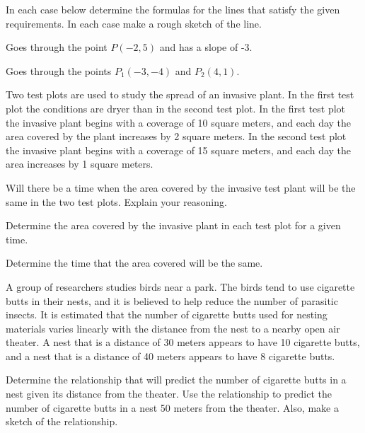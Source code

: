 \begin{problem}
\item In each case below determine the formulas for the lines that
  satisfy the given requirements. In each case make a rough sketch of
  the line.

  \begin{subproblem}
  \item Goes through the point $P(-2,5)$ and has a slope of -3.
    \vfill
  \item Goes through the points $P_1(-3,-4)$ and $P_2(4,1)$.
    \vfill
  \end{subproblem}

  \clearpage

\item Two test plots are used to study the spread of an invasive
  plant. In the first test plot the conditions are dryer than in the
  second test plot. In the first test plot the invasive plant begins
  with a coverage of 10 square meters, and each day the area covered
  by the plant increases by 2 square meters. In the second test plot
  the invasive plant begins with a coverage of 15 square meters, and
  each day the area increases by 1 square meters.

  \begin{subproblem}
  \item Will there be a time when the area covered by the invasive
    test plant will be the same in the two test plots. Explain your
    reasoning.  
    \vfill

  \item Determine the area covered by the invasive plant in each test
    plot for a given time.
    \vfill

  \item Determine the time that the area covered will be the same.
    \vfill
  \end{subproblem}

  \clearpage

\item A group of researchers studies birds near a park. The birds tend
  to use cigarette butts in their nests, and it is believed to help
  reduce the number of parasitic insects. It is estimated that the
  number of cigarette butts used for nesting materials varies linearly
  with the distance from the nest to a nearby open air theater. A nest
  that is a distance of 30 meters appears to have 10 cigarette butts,
  and a nest that is a distance of 40 meters appears to have 8
  cigarette butts.
  \begin{subproblem}
  \item Determine the relationship that will predict the number of
    cigarette butts in a nest given its distance from the theater.
    Use the relationship to predict the number of cigarette butts in a
    nest 50 meters from the theater. Also, make a sketch of the
    relationship.  


\end{subproblem}
\end{problem}
